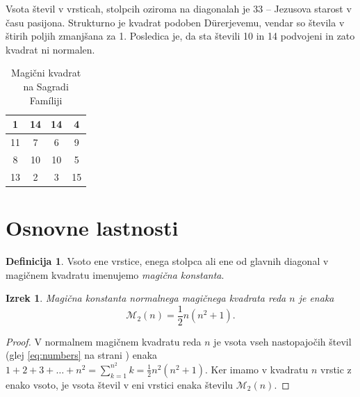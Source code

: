 \documentclass[a4paper,12pt]{article}
\newcommand{\pojem}[1]{\emph{\color{purple}#1}}
\newcommand{\m}{\mathcal{M}_2}
\theoremstyle{definition}
\newtheorem{definicija}{Definicija}
\theoremstyle{plain}
\newtheorem{izrek}{Izrek}
\begin{document}
Vsota števil v vrsticah, stolpcih oziroma na diagonalah je 33 -- Jezusova starost
v času pasijona. Strukturno je kvadrat podoben Dürerjevemu, vendar so števila
v štirih poljih zmanjšana za 1. Posledica je, da sta števili 10 in 14 podvojeni
in zato kvadrat ni normalen.
%
\begin{table}[!ht]
   \centering
   \caption{Magični kvadrat na Sagradi Famíliji}
   \label{table:sagrada}
   \begin{tabular}{|c|c|c|c|}
      \hline
      1 & 14 & 14 & 4 \\ \hline
      11 & 7 & 6 & 9 \\ \hline
      8 & 10 & 10 & 5 \\ \hline
      13 & 2 & 3 & 15 \\ \hline
   \end{tabular}
\end{table}

\section{Osnovne lastnosti}

\begin{definicija}
   Vsoto ene vrstice, enega stolpca ali ene od glavnih diagonal
   v magičnem kvadratu imenujemo \pojem{magična konstanta}.
\end{definicija}

\begin{izrek}
   Magična konstanta normalnega magičnega kvadrata reda \(n\)
   je enaka
   \begin{equation}
      \label{eq:mc}
      \m(n) = \frac{1}{2} n(n^2+1).
   \end{equation}
\end{izrek}

\begin{proof}
   V normalnem magičnem kvadratu reda \(n\) je vsota vseh nastopajočih
   števil (glej \eqref{eq:numbers} na strani \pageref{eq:numbers}) enaka
   \(1+2+3+\ldots+n^2=\sum_{k=1}^{n^2}k=\frac{1}{2}n^2(n^2+1)\). Ker imamo
   v kvadratu \(n\) vrstic z enako vsoto, je vsota števil v eni vrstici
   enaka številu \(\m(n)\).
\end{proof}
\end{document}
